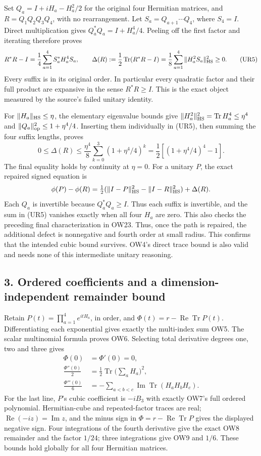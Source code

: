 \documentclass[11pt]{article}
\begin{document}
Set \(Q_a=I+iH_a-H_a^2/2\) for the original four Hermitian matrices, and \(R=Q_1Q_2Q_3Q_4\), with no rearrangement. Let \(S_a=Q_{a+1}\cdots Q_4\), where \(S_4=I\). Direct multiplication gives \(Q_a^*Q_a=I+H_a^4/4\). Peeling off the first factor and iterating therefore proves
\[
 R^*R-I=\frac14\sum_{a=1}^4S_a^*H_a^4S_a,\qquad
 \Delta(R):=\frac12\operatorname{Tr}(R^*R-I)
     =\frac18\sum_{a=1}^4\|H_a^2S_a\|_{\rm HS}^2\ge0.
 \tag{UR5}
\]
Every suffix is in its original order. In particular every quadratic factor and their full product are expansive in the sense \(R^*R\ge I\). This is the exact object measured by the source's failed unitary identity.

For \(\|H_a\|_{\rm HS}\le\eta\), the elementary eigenvalue bounds give
\(\|H_a^2\|_{\rm HS}^2=\operatorname{Tr}H_a^4\le\eta^4\) and
\(\|Q_a\|_{\rm op}^2\le1+\eta^4/4\). Inserting them individually in (UR5), then summing the four suffix lengths, proves
\[
 0\le\Delta(R)\le
 \frac{\eta^4}{8}\sum_{k=0}^3(1+\eta^4/4)^k
 =\frac12[(1+\eta^4/4)^4-1].
 \tag{UR6}
\]
The final equality holds by continuity at \(\eta=0\). For a unitary \(P\), the exact repaired signed equation is
\[
 \phi(P)-\phi(R)
 =\tfrac12(\|I-P\|_{\rm HS}^2-\|I-R\|_{\rm HS}^2)+\Delta(R).
\]
Each \(Q_a\) is invertible because \(Q_a^*Q_a\ge I\). Thus each suffix is invertible, and the sum in (UR5) vanishes exactly when all four \(H_a\) are zero. This also checks the preceding final characterization in OW23. Thus, once the path is repaired, the additional defect is nonnegative and fourth order at small radius. This confirms that the intended cubic bound survives. OW4's direct trace bound is also valid and needs none of this intermediate unitary reasoning.

\subsection*{3. Ordered coefficients and a dimension-independent remainder bound}

Retain \(P(t)=\prod_{a=1}^4e^{itH_a}\), in order, and \(\Phi(t)=r-\operatorname{Re}\operatorname{Tr}P(t)\). Differentiating each exponential gives exactly the multi-index sum OW5. The scalar multinomial formula proves OW6. Selecting total derivative degrees one, two and three gives
\[
 \begin{aligned}
 \Phi(0)&=\Phi'(0)=0,\\
 \frac{\Phi''(0)}2&=\frac12\operatorname{Tr}\Big(\sum_aH_a\Big)^2,\\
 \frac{\Phi'''(0)}6&=-\sum_{a<b<c}
                     \operatorname{Im}\operatorname{Tr}(H_aH_bH_c).
 \end{aligned}\tag{UR7}
\]
For the last line, \(P\)'s cubic coefficient is \(-iB_3\) with exactly OW7's full ordered polynomial. Hermitian-cube and repeated-factor traces are real; \(\operatorname{Re}(-iz)=\operatorname{Im}z\), and the minus sign in \(\Phi=r-\operatorname{Re}\operatorname{Tr}P\) gives the displayed negative sign. Four integrations of the fourth derivative give the exact OW8 remainder and the factor \(1/24\); three integrations give OW9 and \(1/6\). These bounds hold globally for all four Hermitian matrices.
\end{document}
